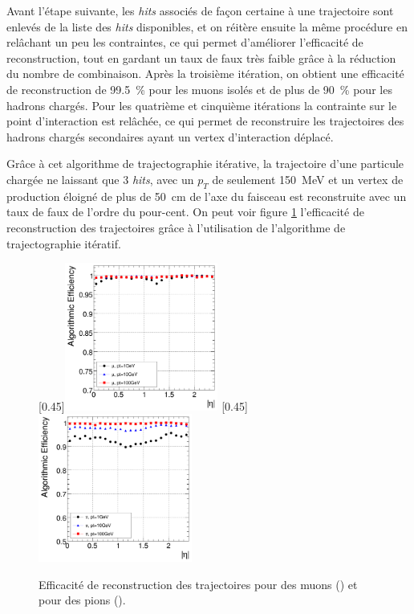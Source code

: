 Avant l'étape suivante, les \emph{hits} associés de façon certaine à une trajectoire sont enlevés de la liste des \emph{hits} disponibles, et on réitère ensuite la même procédure en relâchant un peu les contraintes, ce qui permet d'améliorer l'efficacité de reconstruction, tout en gardant un taux de faux très faible grâce à la réduction du nombre de combinaison. Après la troisième itération, on obtient une efficacité de reconstruction de \SI{99.5}{\%} pour les muons isolés et de plus de \SI{90}{\%} pour les hadrons chargés. Pour les quatrième et cinquième itérations la contrainte sur le point d'interaction est relâchée, ce qui permet de reconstruire les trajectoires des hadrons chargés secondaires ayant un vertex d'interaction déplacé.

Grâce à cet algorithme de trajectographie itérative, la trajectoire d'une particule chargée ne laissant que 3 \emph{hits}, avec un $p_T$ de seulement \SI{150}{\MeV} et un vertex de production éloigné de plus de \SI{50}{\cm} de l'axe du faisceau est reconstruite avec un taux de faux de l'ordre du pour-cent. On peut voir figure \ref{fig:iterative_tracking_eff} l'efficacité de reconstruction des trajectoires grâce à l'utilisation de l'algorithme de trajectographie itératif.

\begin{figure} \centering
  \subcaptionbox{\label{fig:tracking_eff_mu}}[0.45\textwidth]{\includegraphics[width=0.45\textwidth]{chapitre3/figs/iterative_tracking_mu.pdf}}\hfill
  \subcaptionbox{\label{fig:tracking_eff_pi}}[0.45\textwidth]{\includegraphics[width=0.45\textwidth]{chapitre3/figs/iterative_tracking_pi.pdf}}
  \caption{Efficacité de reconstruction des trajectoires pour des muons () et pour des pions ().}
  \label{fig:iterative_tracking_eff}
\end{figure}

